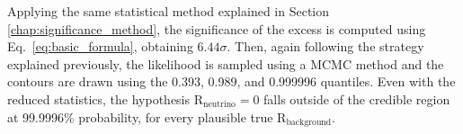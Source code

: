 Applying the same statistical method explained in Section \ref{chap:significance_method}, the significance of the excess is computed using Eq.~\ref{eq:basic_formula}, obtaining $6.44\sigma$.
Then, again following the strategy explained previously, the likelihood is sampled using a MCMC method and the contours are drawn using the 0.393, 0.989, and 0.999996 quantiles. Even with the reduced statistics, the hypothesis \(\text{R}_{\text{neutrino}}=0\) falls outside of the credible region at 99.9996\% probability, for every plausible true \(\text{R}_{\text{background}}\).


\clearpage
